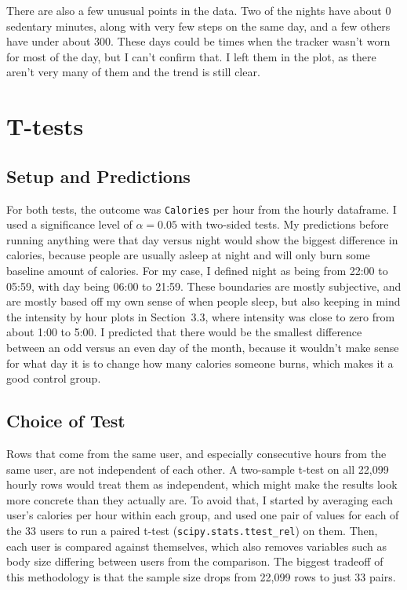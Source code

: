 \documentclass[11pt]{article}
\begin{document}
There are also a few unusual points in the data.
Two of the nights have about 0 sedentary minutes, along with very few steps on the same day, and a few others have under about 300.
These days could be times when the tracker wasn't worn for most of the day, but I can't confirm that.
I left them in the plot, as there aren't very many of them and the trend is still clear.

\section{T-tests}
\label{sec:s4}

\subsection{Setup and Predictions}

For both tests, the outcome was \texttt{Calories} per hour from the hourly dataframe.
I used a significance level of $\alpha = 0.05$ with two-sided tests.
My predictions before running anything were that day versus night would show the biggest difference in calories, because people are usually asleep at night and will only burn some baseline amount of calories.
For my case, I defined night as being from 22:00 to 05:59, with day being 06:00 to 21:59.
These boundaries are mostly subjective, and are mostly based off my own sense of when people sleep, but also keeping in mind the intensity by hour plots in Section~3.3, where intensity was close to zero from about 1:00 to 5:00.
I predicted that there would be the smallest difference between an odd versus an even day of the month, because it wouldn't make sense for what day it is to change how many calories someone burns, which makes it a good control group.

\subsection{Choice of Test}

Rows that come from the same user, and especially consecutive hours from the same user, are not independent of each other.
A two-sample t-test on all 22,099 hourly rows would treat them as independent, which might make the results look more concrete than they actually are.
To avoid that, I started by averaging each user's calories per hour within each group, and used one pair of values for each of the 33 users to run a paired t-test (\texttt{scipy.stats.ttest\_rel}) on them.
Then, each user is compared against themselves, which also removes variables such as body size differing between users from the comparison.
The biggest tradeoff of this methodology is that the sample size drops from 22,099 rows to just 33 pairs.
\end{document}
